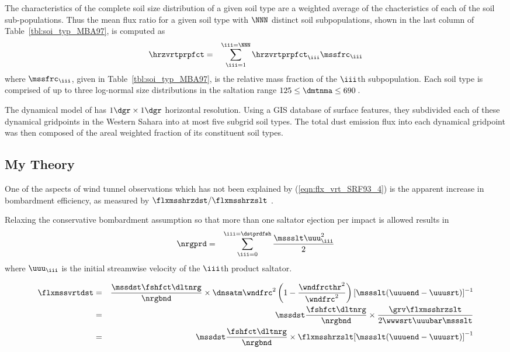 \documentclass[12pt,twoside]{book}
\begin{document}
The characteristics of the complete soil size distribution of a given
soil type are a weighted average of the chacteristics of each of the
soil sub-populations.
Thus the mean flux ratio for a given soil type with $\NNN$ distinct
soil subpopulations, shown in the last column of
Table~\ref{tbl:soi_typ_MBA97}, is computed as 
\begin{eqnarray}
\hrzvrtprpfct & = & \sum_{\iii = 1}^{\iii = \NNN} 
\hrzvrtprpfct_{\iii} \mssfrc_{\iii}
\label{eqn:hrz_vrt_prp_fct_MBA97}
\end{eqnarray}
where $\mssfrc_{\iii}$, given in Table~\ref{tbl:soi_typ_MBA97}, 
is the relative mass fraction of the $\iii$th subpopulation.
Each soil type is comprised of up to three log-normal size
distributions in the saltation range $125 \le \dmtnma \le 690$\,\um.

The dynamical model of \cite{MBA97} has $1\dgr \times 1\dgr$
horizontal resolution.
Using a GIS database of surface features, they subdivided each of
these dynamical gridpoints in the Western Sahara into at most five
subgrid soil types.
The total dust emission flux into each dynamical gridpoint was
then composed of the areal weighted fraction of its constituent soil
types. 

\subsection[My Theory]{My Theory}\label{sxn:vrt_csz}
One of the aspects of wind tunnel observations which has not been
explained by (\ref{eqn:flx_vrt_SRF93_4}) is the apparent increase
in bombardment efficiency, as measured by $\flxmsshrzdst/\flxmsshrzslt$
\cite[c.f.][Figure~5]{SRF93}.  

Relaxing the conservative bombardment assumption so that more than 
one saltator ejection per impact is allowed results in 
\begin{eqnarray}
\nrgprd & = & \sum_{\iii = 0}^{\iii = \dstprdfsh}
\frac{\mssslt \uuu_{\iii}^{2}}{2}
\label{eqn:nrg_prd_dfn}
\end{eqnarray}
where $\uuu_{\iii}$ is the initial streamwise velocity of the $\iii$th
product saltator.

\begin{eqnarray}
\flxmssvrtdst & = & \frac{\mssdst \fshfct \dltnrg}{\nrgbnd } \times
\dnsatm \wndfrc^{2} \left( 1 - \frac{\wndfrcthr^{2}}{\wndfrc^{2} } \right)
[ \mssslt ( \uuuend - \uuusrt ) ]^{-1} \\
& = & \mssdst \frac{\fshfct \dltnrg}{\nrgbnd } \times
\frac{\grv \flxmsshrzslt}{2 \wwwsrt \uuubar \mssslt } \\
& = & \mssdst \frac{\fshfct \dltnrg}{\nrgbnd } \times
\flxmsshrzslt [ \mssslt ( \uuuend - \uuusrt ) ]^{-1}
\label{eqn:flx_vrt_csz}
\end{eqnarray}
\end{document}
